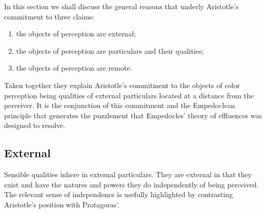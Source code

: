 In this section we shall discuss the general reasons that underly Aristotle's commitment to three claims:
\begin{enumerate}[(1)]
    \item the objects of perception are external;
    \item the objects of perception are particulars and their qualities;
    \item the objects of perception are remote.
\end{enumerate}
Taken together they explain Aristotle's commitment to the objects of color perception being qualities of external particulars located at a distance from the perceiver. It is the conjunction of this commitment and the Empedoclean principle that generates the puzzlement that Empedocles' theory of effluences was designed to resolve.

\subsection{External} %
\label{sub:external}

Sensible qualities inhere in external particulars. They are external in that they exist and have the natures and powers they do independently of being perceived. The relevant sense of independence is usefully highlighted by contrasting Aristotle's position with Protagoras'.

